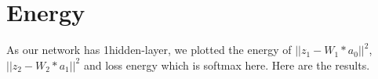 \documentclass{article}
\begin{document}
\section{Energy}
As our network has 1hidden-layer, we plotted the energy of $||z_1 - W_1*a_0||^2$, $||z_2 - W_2*a_1||^2$ and loss energy which is softmax here.
Here are the results.
\begin{figure}[htbp]
\centering
{}

\end{figure}
\end{document}

